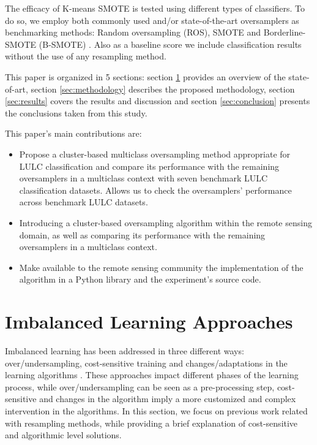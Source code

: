 \documentclass[information,article,submit,moreauthors,pdftex]{Definitions/mdpi}
\begin{document}
\begin{paracol}{2}
\linenumbers
\switchcolumn

The efficacy of K-means SMOTE is tested using different
types of classifiers. To do so, we employ both commonly used and/or
state-of-the-art oversamplers as benchmarking methods: Random oversampling
(ROS), SMOTE and Borderline-SMOTE (B-SMOTE) \citep{Han2005}. Also
as a baseline score we include classification results without the use of any
resampling method.

This paper is organized in 5 sections: section \ref{sec:sota} provides an
overview of the state-of-art, section \ref{sec:methodology} describes the
proposed methodology, section \ref{sec:results} covers the results and
discussion and section \ref{sec:conclusion} presents the conclusions taken from
this study.

This paper's main contributions are:
\begin{itemize}
    \item Propose a cluster-based multiclass oversampling method appropriate
        for LULC classification and compare its performance with the remaining
        oversamplers in a multiclass context with seven benchmark LULC
        classification datasets. Allows us to check the oversamplers'
        performance across benchmark LULC datasets.
    \item Introducing a cluster-based oversampling algorithm within the remote
        sensing domain, as well as comparing its performance with the remaining
        oversamplers in a multiclass context.
    \item Make available to the remote sensing community the implementation
        of the algorithm in a Python library and the experiment's source
        code.
\end{itemize}

\section{Imbalanced Learning Approaches} \label{sec:sota}

Imbalanced learning has been addressed in three different ways:
over/undersampling, cost-sensitive training and changes/adaptations in the
learning algorithms \citep{Kaur2019}. These approaches impact different
phases of the learning process, while over/undersampling can be seen as a
pre-processing step, cost-sensitive and changes in the algorithm imply a more
customized and complex intervention in the algorithms. In this
section, we focus on previous work related with resampling methods, while
providing a brief explanation of cost-sensitive and algorithmic level solutions.


\end{paracol}
\end{document}
